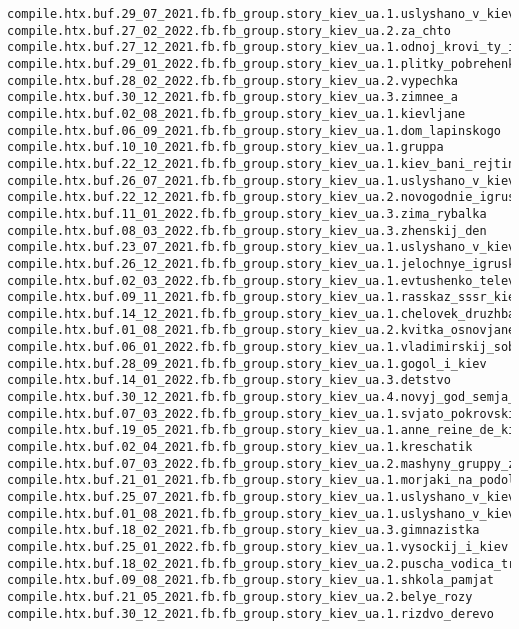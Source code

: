 \begin{Verbatim}
compile.htx.buf.29_07_2021.fb.fb_group.story_kiev_ua.1.uslyshano_v_kieve_8
compile.htx.buf.27_02_2022.fb.fb_group.story_kiev_ua.2.za_chto
compile.htx.buf.27_12_2021.fb.fb_group.story_kiev_ua.1.odnoj_krovi_ty_i_ja
compile.htx.buf.29_01_2022.fb.fb_group.story_kiev_ua.1.plitky_pobrehenki_60_70_rokiv
compile.htx.buf.28_02_2022.fb.fb_group.story_kiev_ua.2.vypechka
compile.htx.buf.30_12_2021.fb.fb_group.story_kiev_ua.3.zimnee_a
compile.htx.buf.02_08_2021.fb.fb_group.story_kiev_ua.1.kievljane
compile.htx.buf.06_09_2021.fb.fb_group.story_kiev_ua.1.dom_lapinskogo
compile.htx.buf.10_10_2021.fb.fb_group.story_kiev_ua.1.gruppa
compile.htx.buf.22_12_2021.fb.fb_group.story_kiev_ua.1.kiev_bani_rejting
compile.htx.buf.26_07_2021.fb.fb_group.story_kiev_ua.1.uslyshano_v_kieve_7
compile.htx.buf.22_12_2021.fb.fb_group.story_kiev_ua.2.novogodnie_igrushki
compile.htx.buf.11_01_2022.fb.fb_group.story_kiev_ua.3.zima_rybalka
compile.htx.buf.08_03_2022.fb.fb_group.story_kiev_ua.3.zhenskij_den
compile.htx.buf.23_07_2021.fb.fb_group.story_kiev_ua.1.uslyshano_v_kieve_4
compile.htx.buf.26_12_2021.fb.fb_group.story_kiev_ua.1.jelochnye_igruski
compile.htx.buf.02_03_2022.fb.fb_group.story_kiev_ua.1.evtushenko_televyshka
compile.htx.buf.09_11_2021.fb.fb_group.story_kiev_ua.1.rasskaz_sssr_kiev
compile.htx.buf.14_12_2021.fb.fb_group.story_kiev_ua.1.chelovek_druzhba
compile.htx.buf.01_08_2021.fb.fb_group.story_kiev_ua.2.kvitka_osnovjanenko_pismo
compile.htx.buf.06_01_2022.fb.fb_group.story_kiev_ua.1.vladimirskij_sobor
compile.htx.buf.28_09_2021.fb.fb_group.story_kiev_ua.1.gogol_i_kiev
compile.htx.buf.14_01_2022.fb.fb_group.story_kiev_ua.3.detstvo
compile.htx.buf.30_12_2021.fb.fb_group.story_kiev_ua.4.novyj_god_semja_1950
compile.htx.buf.07_03_2022.fb.fb_group.story_kiev_ua.1.svjato_pokrovskij_molitva
compile.htx.buf.19_05_2021.fb.fb_group.story_kiev_ua.1.anne_reine_de_kiev
compile.htx.buf.02_04_2021.fb.fb_group.story_kiev_ua.1.kreschatik
compile.htx.buf.07_03_2022.fb.fb_group.story_kiev_ua.2.mashyny_gruppy_zet
compile.htx.buf.21_01_2021.fb.fb_group.story_kiev_ua.1.morjaki_na_podole
compile.htx.buf.25_07_2021.fb.fb_group.story_kiev_ua.1.uslyshano_v_kieve_6
compile.htx.buf.01_08_2021.fb.fb_group.story_kiev_ua.1.uslyshano_v_kieve_9
compile.htx.buf.18_02_2021.fb.fb_group.story_kiev_ua.3.gimnazistka
compile.htx.buf.25_01_2022.fb.fb_group.story_kiev_ua.1.vysockij_i_kiev
compile.htx.buf.18_02_2021.fb.fb_group.story_kiev_ua.2.puscha_vodica_tramvaj_marshrut
compile.htx.buf.09_08_2021.fb.fb_group.story_kiev_ua.1.shkola_pamjat
compile.htx.buf.21_05_2021.fb.fb_group.story_kiev_ua.2.belye_rozy
compile.htx.buf.30_12_2021.fb.fb_group.story_kiev_ua.1.rizdvo_derevo
\end{Verbatim}
